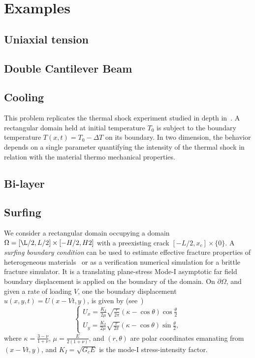 \documentclass[10pt,oneside]{memoir}
\begin{document}
\chapter{Examples}
\section{Uniaxial tension}

\section{Double Cantilever Beam}

\section{Cooling}
This problem replicates the thermal shock experiment studied in depth in~\cite{Sicsic-Marigo-2013a,Bourdin-Marigo-EtAl-2014a}. A rectangular domain held at initial temperature $T_0$ is subject to the boundary temperature $T(x,t) = T_0 - \Delta T$ on its boundary. In two dimension, the behavior depends on a single parameter quantifying the intensity of the thermal shock in relation with the material thermo mechanical properties.


\section{Bi-layer}

\section{Surfing}
We consider a rectangular domain occupying a domain $\Omega = [\L/2,L/2] \times [-H/2,H2]$ with a preexisting crack $[-L/2,x_c] \times \{0\}$.
A \emph{surfing boundary condition} can be used to estimate effective fracture properties of heterogeneous materials~\cite{Hossein-Hsueh-EtAl-2014a} or as a verification numerical simulation for a brittle fracture simulator. 
It is a translating plane-stress Mode-I asymptotic far field boundary displacement is applied on the boundary of the domain. 
On $\partial \Omega$, and given a rate of loading $V$, one the boundary displacement $u(x,y,t) = U(x-Vt,y)$,  is given by (see~\cite{Zehnder-2012a})
\begin{equation}
\left\{
\begin{array}{l}
\displaystyle U_x = \frac{K_I}{2\mu}\sqrt{\frac{r}{2\pi}}(\kappa-\cos\theta)\cos{\frac{\theta}{2}}\\
\displaystyle U_y =\frac{K_I}{2\mu}\sqrt{\frac{r}{2\pi}}(\kappa-\cos\theta)\sin{\frac{\theta}{2}},
\end{array}
\right.
\end{equation}
where $\kappa = \frac{3-\nu}{1+\nu}$, $\mu = \frac{E}{2(1+\nu)}$, and $(r , \theta)$ are polar coordinates emanating from $(x-Vt,y)$, and $K_I = \sqrt{G_c E}$ is the mode-I stress-intensity factor.
\end{document}
